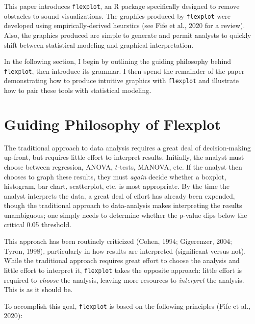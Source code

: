 \documentclass[
  man]{apa6}
\begin{document}
This paper introduces \texttt{flexplot}, an R package specifically designed to remove obstacles to sound visualizations. The graphics produced by \texttt{flexplot} were developed using empirically-derived heurstics (see Fife et al., 2020 for a review). Also, the graphics produced are simple to generate and permit analysts to quickly shift between statistical modeling and graphical interpretation.

In the following section, I begin by outlining the guiding philosophy behind \texttt{flexplot}, then introduce its grammar. I then spend the remainder of the paper demonstrating how to produce intuitive graphics with \texttt{flexplot} and illustrate how to pair these tools with statistical modeling.

\hypertarget{guiding-philosophy-of-flexplot}{%
\section{Guiding Philosophy of Flexplot}\label{guiding-philosophy-of-flexplot}}

The traditional approach to data analysis requires a great deal of decision-making up-front, but requires little effort to interpret results. Initially, the analyst must choose between regression, ANOVA, \(t\)-tests, MANOVA, etc. If the analyst then chooses to graph these results, they must \emph{again} decide whether a boxplot, histogram, bar chart, scatterplot, etc. is most appropriate. By the time the analyst interprets the data, a great deal of effort has already been expended, though the traditional approach to data-analysis makes interpreting the results unambiguous; one simply needs to determine whether the p-value dips below the critical 0.05 threshold.

This approach has been routinely criticized (Cohen, 1994; Gigerenzer, 2004; Tyron, 1998), particularly in how results are interpreted (significant versus not). While the traditional approach requires great effort to choose the analysis and little effort to interpret it, \texttt{flexplot} takes the opposite approach: little effort is required to \emph{choose} the analysis, leaving more resources to \emph{interpret} the analysis. This is as it should be.

To accomplish this goal, \texttt{flexplot} is based on the following principles (Fife et al., 2020):
\end{document}
